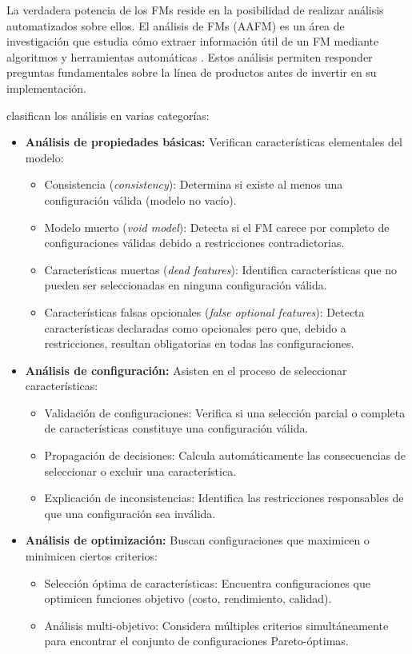La verdadera potencia de los \ac{FM}s reside en la posibilidad de realizar análisis 
automatizados sobre ellos. El análisis de \ac{FM}s (\ac{AAFM}) es un área de investigación que estudia cómo extraer información 
útil de un \ac{FM} mediante algoritmos y herramientas automáticas 
\citep{benavides2010automated}. Estos análisis permiten responder 
preguntas fundamentales sobre la línea de productos antes de invertir 
en su implementación.

\citet{benavides2010automated} clasifican los análisis en varias categorías:

\begin{itemize}
    \item \textbf{Análisis de propiedades básicas:} Verifican características elementales del modelo:
    \begin{itemize}
        \item Consistencia (\textit{consistency}): Determina si existe al menos una configuración válida (modelo no vacío).
        \item Modelo muerto (\textit{void model}): Detecta si el \ac{FM} carece por completo de configuraciones válidas debido a restricciones contradictorias.
        \item Características muertas (\textit{dead features}): Identifica características que no pueden ser seleccionadas en ninguna configuración válida.
        \item Características falsas opcionales (\textit{false optional features}): Detecta características declaradas como opcionales pero que, debido a restricciones, resultan obligatorias en todas las configuraciones.
    \end{itemize}
    
    \item \textbf{Análisis de configuración:} Asisten en el proceso de seleccionar características:
    \begin{itemize}
        \item Validación de configuraciones: Verifica si una selección parcial o completa de características constituye una configuración válida.
        \item Propagación de decisiones: Calcula automáticamente las consecuencias de seleccionar o excluir una característica.
        \item Explicación de inconsistencias: Identifica las restricciones responsables de que una configuración sea inválida.
    \end{itemize}
    
    \item \textbf{Análisis de optimización:} Buscan configuraciones que maximicen o minimicen ciertos criterios:
    \begin{itemize}
        \item Selección óptima de características: Encuentra configuraciones que optimicen funciones objetivo (costo, rendimiento, calidad).
        \item Análisis multi-objetivo: Considera múltiples criterios simultáneamente para encontrar el conjunto de configuraciones Pareto-óptimas.
    \end{itemize}
\end{itemize}

